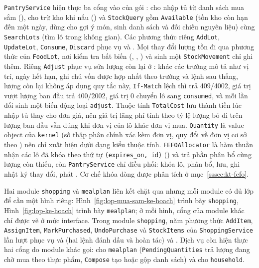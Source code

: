 \texttt{PantryService} hiện thực ba cổng vào của gói :  cho nhập tủ từ danh sách mua sắm (),  cho trừ kho khi nấu () và \texttt{StockQuery} gồm \texttt{Available} (tồn kho còn hạn đến một ngày, dùng cho gợi ý món, sinh danh sách và đối chiếu nguyên liệu) cùng \texttt{SearchLots} (tìm lô trong không gian). Các phương thức riêng \texttt{AddLot}, \texttt{UpdateLot}, \texttt{Consume}, \texttt{Discard} phục vụ  và . Mọi thay đổi lượng tồn đi qua phương thức của \texttt{FoodLot}, nơi kiểm tra bất biến (, , ) và sinh một \texttt{StockMovement} chỉ ghi thêm. Riêng \texttt{Adjust} phục vụ sửa lượng còn lại ở : khác các trường mô tả như vị trí, ngày hết hạn, ghi chú vốn được hợp nhất theo trường và lệnh sau thắng, lượng còn lại không áp dụng quy tắc này, \texttt{If-Match} lệch thì trả 409/4002, giá trị vượt lượng ban đầu trả 400/2002, giá trị 0 chuyển lô sang \texttt{consumed}, và mỗi lần đổi sinh một biến động loại \texttt{adjust}. Thuộc tính \texttt{TotalCost} lưu thành tiền lúc nhập tủ thay cho đơn giá, nên giá trị lãng phí tính theo tỷ lệ lượng bỏ đi trên lượng ban đầu vẫn đúng khi đơn vị của lô khác đơn vị mua. \texttt{Quantity} là value object của \texttt{kernel} (số thập phân chính xác kèm đơn vị, quy đổi về đơn vị cơ sở theo ) nên chỉ xuất hiện dưới dạng kiểu thuộc tính. \texttt{FEFOAllocator} là hàm thuần nhận các lô đã khóa theo thứ tự \texttt{(expires\_on, id)} () và trả phần phân bổ cùng lượng còn thiếu, còn \texttt{PantryService} chỉ điều phối: khóa lô, phân bổ, lưu, ghi nhật ký thay đổi, phát . Cơ chế khóa dòng được phân tích ở mục~\ref{sssec:kt-fefo}.

Hai module \texttt{shopping} và \texttt{mealplan} liên kết chặt qua  nhưng mỗi module có đủ lớp để cần một hình riêng: Hình~\ref{fig:lop-mua-sam-ke-hoach} trình bày \texttt{shopping}, Hình~\ref{fig:lop-ke-hoach} trình bày \texttt{mealplan}; ở mỗi hình, cổng của module khác chỉ được vẽ ở mức interface. Trong module \texttt{shopping}, năm phương thức \texttt{AddItem}, \texttt{AssignItem}, \texttt{MarkPurchased}, \texttt{UndoPurchase} và \texttt{StockItems} của \texttt{ShoppingService} lần lượt phục vụ  và  (hai lệnh đánh dấu và hoàn tác) và . Dịch vụ còn hiện thực hai cổng do module khác gọi:  cho \texttt{mealplan} (\texttt{PendingQuantities} trả lượng đang chờ mua theo thực phẩm, \texttt{Compose} tạo hoặc gộp danh sách) và  cho \texttt{household}.

